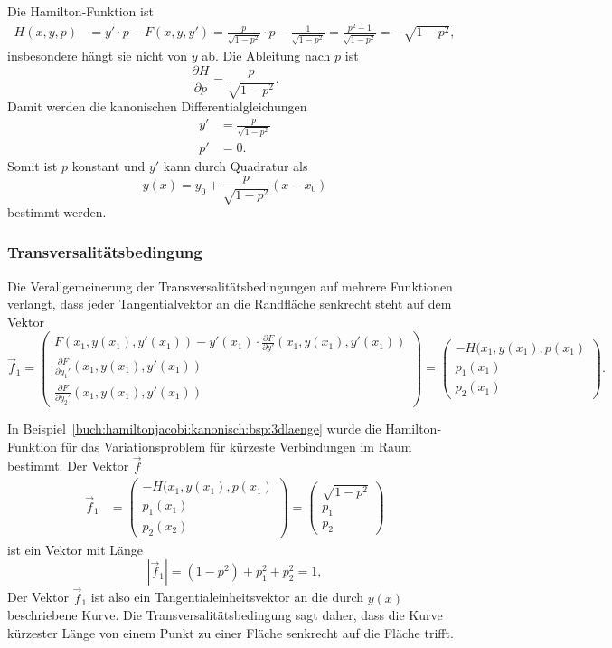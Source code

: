 \begin{beispiel}
Die Hamilton-Funktion ist
\begin{align*}
H(x,y,p)
&=
y'\cdot p - F(x,y,y')
=
\frac{p}{\sqrt{1-p^2}}\cdot p - \frac{1}{\sqrt{1-p^2}}
=
\frac{p^2-1}{\sqrt{1-p^2}}
=
-\sqrt{1-p^2},
\end{align*}
insbesondere hängt sie nicht von $y$ ab.
Die Ableitung nach $p$ ist
\[
\frac{\partial H}{\partial p}
=
\frac{p}{\sqrt{1-p^2}}.
\]
Damit werden die kanonischen Differentialgleichungen
\begin{align*}
y' &= \frac{p}{\sqrt{1-p^2}} \\
p' &= 0.
\end{align*}
Somit ist $p$ konstant und $y'$ kann durch Quadratur als
\[
y(x)
=
y_0 + \frac{p}{\sqrt{1-p^2}}(x-x_0)
\]
bestimmt werden.
\end{beispiel}

%
%
\subsubsection{Transversalitätsbedingung}
Die Verallgemeinerung der Transversalitätsbedingungen auf mehrere
Funktionen verlangt, dass jeder Tangentialvektor an die Randfläche
senkrecht steht auf dem Vektor
\[
\vec{f}_1
=
\begin{pmatrix}
\displaystyle
F(x_1,y(x_1),y'(x_1))
-
y'(x_1)\cdot \frac{\partial F}{\partial y'}(x_1,y(x_1),y'(x_1))
\\
\displaystyle
\frac{\partial F}{\partial y_1'}(x_1,y(x_1),y'(x_1))
\\[9pt]
\displaystyle
\frac{\partial F}{\partial y_2'}(x_1,y(x_1),y'(x_1))
\end{pmatrix}
=
\begin{pmatrix}
-H(x_1,y(x_1),p(x_1)\\
p_1(x_1)\\
p_2(x_1)
\end{pmatrix}.
\]

\begin{beispiel}
In Beispiel~\ref{buch:hamiltonjacobi:kanonisch:bsp:3dlaenge} wurde
die Hamilton-Funktion für das Variationsproblem für kürzeste Verbindungen
im Raum bestimmt.
Der Vektor $\vec{f}$ 
\begin{align*}
\vec{f}_1
&=
\begin{pmatrix}
-H(x_1,y(x_1),p(x_1)\\
p_1(x_1)\\
p_2(x_2)
\end{pmatrix}
=
\begin{pmatrix}
\sqrt{1-p^2}\\
p_1\\
p_2
\end{pmatrix}
\end{align*}
ist ein Vektor mit Länge
\[
|\vec{f}_1|
=
(1-p^2) + p_1^2+p_2^2
=
1,
\]
Der Vektor $\vec{f}_1$ ist also ein Tangentialeinheitsvektor an die
durch $y(x)$ beschriebene Kurve.
Die Transversalitätsbedingung sagt daher, dass die Kurve kürzester
Länge von einem Punkt zu einer Fläche senkrecht auf die Fläche trifft.
\end{beispiel}


